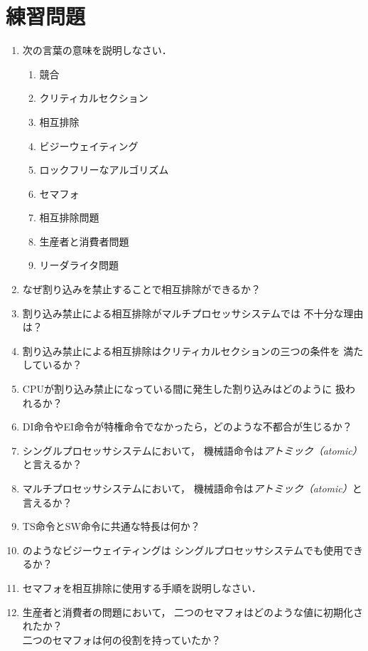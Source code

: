 \section*{練習問題}
\begin{enumerate}
  \renewcommand{\labelenumi}{\ttfamily\arabic{chapter}.\arabic{enumi}}
  \setlength{\leftskip}{1em}
\item 次の言葉の意味を説明しなさい．
  \begin{enumerate}
  \item 競合
  \item クリティカルセクション
  \item 相互排除
  \item ビジーウェイティング
  \item ロックフリーなアルゴリズム
  \item セマフォ
  \item 相互排除問題
  \item 生産者と消費者問題
  \item リーダライタ問題
  \end{enumerate}
\item なぜ割り込みを禁止することで相互排除ができるか？
\item 割り込み禁止による相互排除がマルチプロセッサシステムでは
  不十分な理由は？
\item 割り込み禁止による相互排除はクリティカルセクションの三つの条件を
  満たしているか？
\item CPUが割り込み禁止になっている間に発生した割り込みはどのように
  扱われるか？
\item DI命令やEI命令が特権命令でなかったら，どのような不都合が生じるか？
\item シングルプロセッサシステムにおいて，
  機械語命令は\emph{アトミック（atomic）}と言えるか？
\item マルチプロセッサシステムにおいて，
  機械語命令は\emph{アトミック（atomic）}と言えるか？
\item TS命令とSW命令に共通な特長は何か？
\item {}のようなビジーウェイティングは
  シングルプロセッサシステムでも使用できるか？
\item セマフォを相互排除に使用する手順を説明しなさい．
\item 生産者と消費者の問題において，
  二つのセマフォはどのような値に初期化されたか？\\
  二つのセマフォは何の役割を持っていたか？
\end{enumerate}
